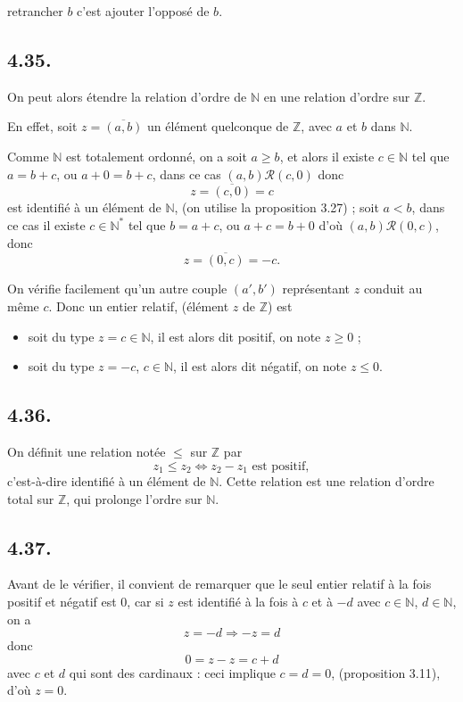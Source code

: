 \begin{center}
retrancher $b$ c'est ajouter l'opposé de $b$.
\end{center}

\subsection*{4.35.}
On peut alors étendre la relation d'ordre de $\mathbb N$ en une relation d'ordre sur $\mathbb Z$.

En effet, soit $z=\overline{(a,b)}$ un élément quelconque de $\mathbb Z$, avec $a$ et $b$ dans $\mathbb N$.

Comme $\mathbb N$ est totalement ordonné, on a soit $a\ge b$, et alors il existe $c\in\mathbb N$ tel que $a=b+c$, ou $a+0=b+c$, dans ce cas $(a,b)\mathcal R(c,0)$ donc
\[
z=\overline{(c,0)}=c
\]
est identifié à un élément de $\mathbb N$, (on utilise la proposition 3.27) ; soit $a<b$, dans ce cas il existe $c\in\mathbb N^*$ tel que $b=a+c$, ou $a+c=b+0$ d'où $(a,b)\mathcal R(0,c)$, donc
\[
z=\overline{(0,c)}=-c.
\]

On vérifie facilement qu'un autre couple $(a',b')$ représentant $z$ conduit au même $c$. Donc un entier relatif, (élément $z$ de $\mathbb Z$) est
\begin{itemize}[leftmargin=2.2em]
\item soit du type $z=c\in\mathbb N$, il est alors dit positif, on note $z\ge0$ ;
\item soit du type $z=-c$, $c\in\mathbb N$, il est alors dit négatif, on note $z\le0$.
\end{itemize}

\subsection*{4.36.}
On définit une relation notée $\le$ sur $\mathbb Z$ par
\[
z_1\le z_2\Longleftrightarrow z_2-z_1\text{ est positif},
\]
c'est-à-dire identifié à un élément de $\mathbb N$. Cette relation est une relation d'ordre total sur $\mathbb Z$, qui prolonge l'ordre sur $\mathbb N$.

\subsection*{4.37.}
Avant de le vérifier, il convient de remarquer que le seul entier relatif à la fois positif et négatif est $0$, car si $z$ est identifié à la fois à $c$ et à $-d$ avec $c\in\mathbb N$, $d\in\mathbb N$, on a
\[
z=-d\Rightarrow -z=d
\]
donc
\[
0=z-z=c+d
\]
avec $c$ et $d$ qui sont des cardinaux : ceci implique $c=d=0$, (proposition 3.11), d'où $z=0$.

